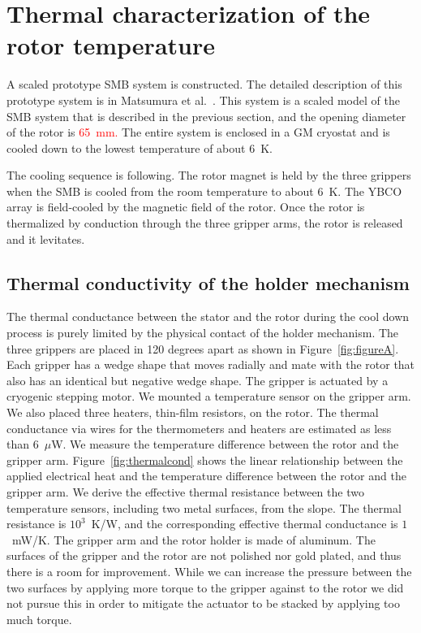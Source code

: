 \documentclass[journal]{IEEEtran}
\def\cred{\textcolor{red}}
\begin{document}
\section{Thermal characterization of the rotor temperature}
A scaled prototype SMB system is constructed.
The detailed description of this prototype system is in Matsumura et al.~\cite{matsumura_eucas2015}.
This system is a scaled model of the SMB system that is described in the previous section, and the opening diameter of the rotor is \cred{65~mm.}
The entire system is enclosed in a GM cryostat and is cooled down to the lowest temperature of about 6~K.

The cooling sequence is following.
The rotor magnet is held by the three grippers when the SMB is cooled from the room temperature to about 6~K.
The YBCO array is field-cooled by the magnetic field of the rotor.
Once the rotor is thermalized by conduction through the three gripper arms, the rotor is released and it levitates.

\subsection{Thermal conductivity of the holder mechanism}
The thermal conductance between the stator and the rotor during the cool down process is purely limited by the physical contact of the holder mechanism.
The three grippers are placed in 120 degrees apart as shown in Figure~\ref{fig:figureA}.
Each gripper has a wedge shape that moves radially and mate with the rotor that also has an identical but negative wedge shape.
The gripper is actuated by a cryogenic stepping motor.
We mounted a temperature sensor on the gripper arm.
We also placed three heaters, thin-film resistors, on the rotor.
The thermal conductance via wires for the thermometers and heaters are estimated as less than 6~$\mu$W.
We measure the temperature difference between the rotor and the gripper arm.
Figure~\ref{fig:thermalcond} shows the linear relationship between the applied electrical heat and the temperature difference between the rotor and the gripper arm.
We derive the effective thermal resistance between the two temperature sensors, including two metal surfaces, from the slope.
The thermal resistance is $10^{3}$~K/W, and the corresponding effective thermal conductance is $1$~mW/K.
The gripper arm and the rotor holder is made of aluminum.
The surfaces of the gripper and the rotor are not polished nor gold plated, and thus there is a room for improvement.
While we can increase the pressure between the two surfaces by applying more torque to the gripper against to the rotor we did not pursue this in order to mitigate the actuator to be stacked by applying too much torque.
\end{document}
